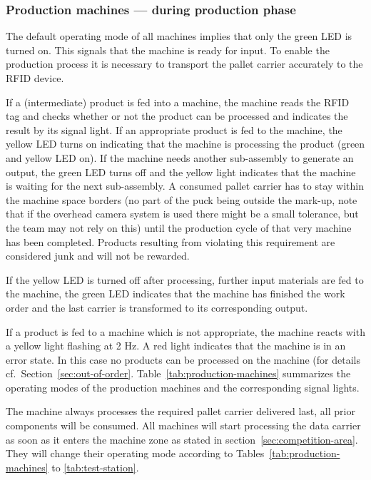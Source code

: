 \documentclass[12pt,twoside]{article}
\newcommand{\refsec}[1]{Section~\ref{#1}}
\begin{document}
\subsubsection{Production machines --- during production phase}
The default operating mode of all machines implies that only the green
LED is turned on. This signals that the machine is ready for input.
To enable the production process it is necessary to transport the
pallet carrier accurately to the RFID device.

If a (intermediate) product is fed into a machine, the machine reads
the RFID tag and checks whether or not the product can be processed
and indicates the result by its signal light. If an appropriate
product is fed to the machine, the yellow LED turns on indicating that
the machine is processing the product (green and yellow LED on). If
the machine needs another sub-assembly to generate an output, the
green LED turns off and the yellow light indicates that the machine is
waiting for the next sub-assembly. A consumed pallet carrier has to
stay within the machine space borders (no part of the puck being
outside the mark-up, note that if the overhead camera system is used
there might be a small tolerance, but the team may not rely on this)
until the production cycle of that very machine has been completed.
Products resulting from violating this requirement are considered junk
and will not be rewarded.

If the yellow LED is turned off after processing, further input
materials are fed to the machine, the green LED indicates that the
machine has finished the work order and the last carrier is
transformed to its corresponding output.

If a product is fed to a machine which is not appropriate, the machine
reacts with a yellow light flashing at 2 Hz. A red light indicates
that the machine is in an error state.  In this case no products can
be processed on the machine (for details
cf.~\refsec{sec:out-of-order}.  Table~\ref{tab:production-machines}
summarizes the operating modes of the production machines and the
corresponding signal lights.

The machine always processes the required pallet carrier delivered
last, all prior components will be consumed. All machines will start
processing the data carrier as soon as it enters the machine zone as
stated in section~\ref{sec:competition-area}. They will change their
operating mode according to Tables~\ref{tab:production-machines} to
\ref{tab:test-station}.
\end{document}
